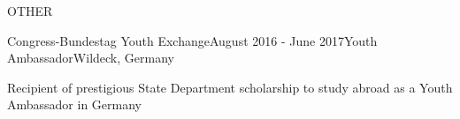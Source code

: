 \documentclass{resume} %
\begin{document}

\begin{rSection}{OTHER}

  \begin{rSubsection}{Congress-Bundestag Youth Exchange}{August 2016 - June 2017}{Youth Ambassador}{Wildeck, Germany} 

  \item Recipient of prestigious State Department scholarship to study abroad as a Youth Ambassador in Germany
    
\end{rSubsection} 

\end{rSection} 
\end{document}

